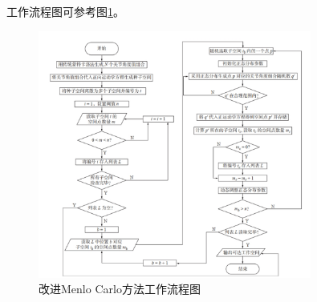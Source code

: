 工作流程图可参考图\ref{fig:9}。

\begin{figure}[h]
    \centering
    \includegraphics[width=0.8\textwidth]{Image/fig9.jpg}
    \caption{改进Menlo Carlo方法工作流程图}
    \label{fig:9}
\end{figure}

